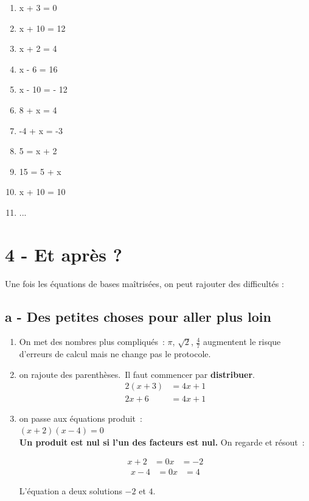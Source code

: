 \documentclass[11pt]{article}
\begin{document}
\begin{multicols}{2}
\begin{enumerate}
    \item x + 3 = 0
    \item x + 10 = 12
    \item x + 2 = 4
    \item x - 6 = 16
    \item x - 10 = - 12
    \item 8 + x = 4
    \item -4 + x = -3
    \item 5 = x + 2
    \item 15 = 5 + x
    \item x + 10 = 10
    \item ...
\end{enumerate}
\end{multicols}
\newpage

\section*{4 - Et après ?}

Une fois les équations de bases maîtrisées, on peut rajouter des difficultés :  


\subsection*{a - Des petites choses pour aller plus loin}

\begin{enumerate}
    \item On met des nombres plus compliqués : $\pi$, $\sqrt{2}$, $\tfrac{4}{7}$ augmentent le risque d’erreurs de calcul mais ne change pas le protocole. 

    \item on rajoute des parenthèses. Il faut commencer par \textbf{distribuer}. 
    \begin{align*}
        2(x+3) &= 4x +1 \\
        2x + 6 &= 4x +1
    \end{align*}
          \item on passe aux équations produit : \\
        $(x+2)(x-4) = 0$  \\
       \textbf{Un produit est nul si l’un des facteurs est nul.}
       On regarde et résout :
    \begin{multicols}{2}
        \begin{align*}
            x+2 &= 0
            x &= -2
        \end{align*}
        \begin{align*}
            x-4 &= 0
            x &= 4
        \end{align*}
\end{multicols} 
		L’équation a deux solutions $-2$ et $4$.
    \end{enumerate}
\end{document}
